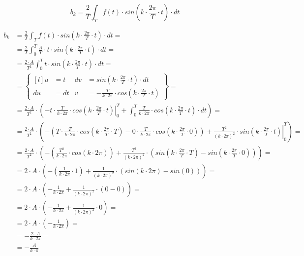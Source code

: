 \begin{task}



\begin{equation}
b_k=\frac{2}{T}\int_{T}f(t) \cdot sin\left( k \cdot \frac{2\pi}{T} \cdot t\right) \cdot dt
\end{equation}


\begin{align*}
b_k&=\frac{2}{T}\int_{T}f(t) \cdot sin\left( k \cdot \frac{2\pi}{T} \cdot t\right) \cdot dt=\\
&=\frac{2}{T}\int_{0}^{T}\frac{A}{T}\cdot t \cdot sin\left( k \cdot \frac{2\pi}{T} \cdot t\right) \cdot dt=\\
&=\frac{2\cdot A}{T^2}\int_{0}^{T} t \cdot sin\left( k \cdot \frac{2\pi}{T} \cdot t\right) \cdot dt=\\
&=\begin{Bmatrix*}[l]
u&=t & dv&=sin\left( k \cdot \frac{2\pi}{T} \cdot t\right) \cdot dt \\
du&=dt & v&=-\frac{T}{k\cdot 2\pi}\cdot cos\left( k \cdot \frac{2\pi}{T} \cdot t\right)
\end{Bmatrix*}=\\
&=\frac{2\cdot A}{T^2}\cdot \left(- \left.t \cdot \frac{T}{k\cdot 2\pi}\cdot cos\left( k \cdot \frac{2\pi}{T} \cdot t\right)\right|_{0}^{T} + \int_{0}^{T} \frac{T}{k\cdot 2\pi}\cdot cos\left( k \cdot \frac{2\pi}{T} \cdot t\right) \cdot dt \right)=\\
&=\frac{2\cdot A}{T^2}\cdot \left(- \left(T \cdot \frac{T}{k\cdot 2\pi}\cdot cos\left( k \cdot \frac{2\pi}{T} \cdot T\right) - 0 \cdot \frac{T}{k\cdot 2\pi}\cdot cos\left( k \cdot \frac{2\pi}{T} \cdot 0\right)\right) + \left. \frac{T^2}{\left(k\cdot 2\pi\right)^2}\cdot sin\left( k \cdot \frac{2\pi}{T} \cdot t\right) \right|_{0}^{T} \right)=\\
&=\frac{2\cdot A}{T^2}\cdot \left(- \left(\frac{T^2}{k\cdot 2\pi}\cdot cos\left( k \cdot 2\pi\right) \right) + \frac{T^2}{\left(k\cdot 2\pi\right)^2}\cdot \left(sin\left( k \cdot \frac{2\pi}{T} \cdot T\right) - sin\left( k \cdot \frac{2\pi}{T} \cdot 0\right)\right) \right)=\\
&=2\cdot A \cdot \left(- \left(\frac{1}{k\cdot 2\pi}\cdot 1 \right) + \frac{1}{\left(k\cdot 2\pi\right)^2}\cdot \left(sin\left( k \cdot 2\pi\right) - sin\left( 0\right)\right) \right)=\\
&=2\cdot A \cdot \left(- \frac{1}{k\cdot 2\pi} + \frac{1}{\left(k\cdot 2\pi\right)^2}\cdot \left(0 - 0\right) \right)=\\
&=2\cdot A \cdot \left(- \frac{1}{k\cdot 2\pi} + \frac{1}{\left(k\cdot 2\pi\right)^2}\cdot 0 \right)=\\
&=2\cdot A \cdot \left(- \frac{1}{k\cdot 2\pi}\right)=\\
&=-\frac{2 \cdot A}{k\cdot 2\pi}=\\
&=-\frac{A}{k\cdot \pi}
\end{align*}


\end{task}
